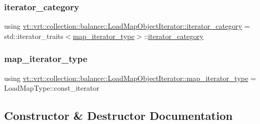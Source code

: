 \subsubsection{\texorpdfstring{iterator\+\_\+category}{iterator\_category}}
{\footnotesize\ttfamily using \hyperlink{structvt_1_1vrt_1_1collection_1_1balance_1_1_load_map_object_iterator_aa2d73306ea28e7f249a28d40dc963fdb}{vt\+::vrt\+::collection\+::balance\+::\+Load\+Map\+Object\+Iterator\+::iterator\+\_\+category} =  std\+::iterator\+\_\+traits$<$\hyperlink{structvt_1_1vrt_1_1collection_1_1balance_1_1_load_map_object_iterator_ae487f542c8875bc4cd60da54da5545ce}{map\+\_\+iterator\+\_\+type}$>$\+::\hyperlink{structvt_1_1vrt_1_1collection_1_1balance_1_1_load_map_object_iterator_aa2d73306ea28e7f249a28d40dc963fdb}{iterator\+\_\+category}}

\mbox{\label{structvt_1_1vrt_1_1collection_1_1balance_1_1_load_map_object_iterator_ae487f542c8875bc4cd60da54da5545ce}} 
\subsubsection{\texorpdfstring{map\+\_\+iterator\+\_\+type}{map\_iterator\_type}}
{\footnotesize\ttfamily using \hyperlink{structvt_1_1vrt_1_1collection_1_1balance_1_1_load_map_object_iterator_ae487f542c8875bc4cd60da54da5545ce}{vt\+::vrt\+::collection\+::balance\+::\+Load\+Map\+Object\+Iterator\+::map\+\_\+iterator\+\_\+type} =  Load\+Map\+Type\+::const\+\_\+iterator}



\subsection{Constructor \& Destructor Documentation}
\mbox{\label{structvt_1_1vrt_1_1collection_1_1balance_1_1_load_map_object_iterator_a7f0af57c990883d3dbf1884665c36a85}} 

